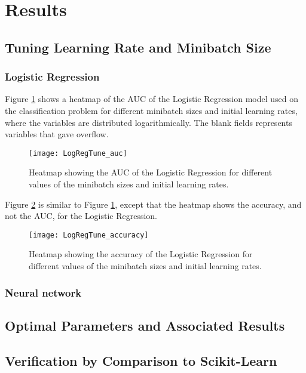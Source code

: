 \section{Results}
\label{sec:results}

\subsection{Tuning Learning Rate and Minibatch Size}

\subsubsection*{Logistic Regression}
Figure \ref{fig:TuneLogReg_auc} shows a heatmap of the AUC of the Logistic Regression model used on the classification problem for different minibatch sizes and initial learning rates, where the variables are distributed logarithmically. The blank fields represents variables that gave overflow. 
\begin{figure}[htbp]
	\centering
	\texttt{[image: LogRegTune\_auc]}
	\caption{Heatmap showing the AUC of the Logistic Regression for different
		values of the minibatch sizes and initial learning rates.}
	\label{fig:TuneLogReg_auc}
\end{figure}

Figure \ref{fig:TuneLogReg_accuracy} is similar to Figure \ref{fig:TuneLogReg_auc}, except that the heatmap shows the accuracy, and not the AUC, for the Logistic Regression. 
\begin{figure}[htbp]
	\centering
	\texttt{[image: LogRegTune\_accuracy]}
	\caption{Heatmap showing the accuracy of the Logistic Regression for different values of the minibatch sizes and initial learning rates.}
	\label{fig:TuneLogReg_accuracy}
\end{figure}

\subsubsection*{Neural network}

\subsection*{Optimal Parameters and Associated Results}

\subsection{Verification by Comparison to Scikit-Learn}

